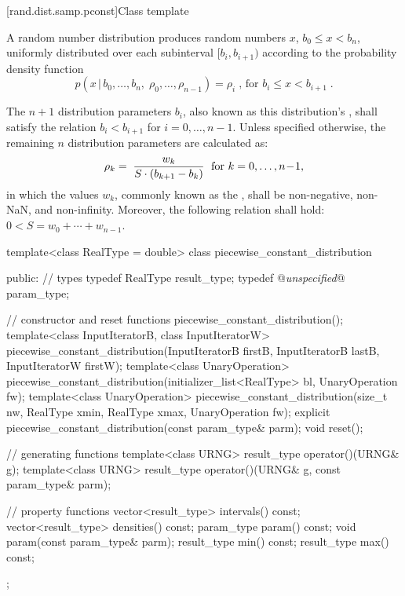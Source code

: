 [rand.dist.samp.pconst]{Class template }%
%

\pnum
A  random number distribution
produces random numbers $x$,
$ b_0 \leq x < b_n $,
uniformly distributed over each subinterval
$ [ b_i, b_{i+1} ) $
according to the probability density function
%
\[%
 p(x\,|\,b_0,\ldots,b_n,\;\rho_0,\ldots,\rho_{n-1})
      = \rho_i
\; \mbox{,}
\mbox{ for } b_i \le x < b_{i+1}
\; \mbox{.}
\]

\pnum
The $n+1$ distribution parameters $b_i$,
also known as this distribution's %
%
%
, shall satisfy the relation
 $ b_i < b_{i+1} $
for $i = 0, \ldots, n\!-\!1 $.
Unless specified otherwise,
the remaining $n$ distribution parameters are calculated as:
\[%
 \rho_k = \;
   {w_k \over {S \cdot (b_{k+1}-b_k)}}
   \; \mbox{ for } k = 0, \ldots, n\!-\!1,
\]
in which the values $w_k$,
commonly known as the %
%
%
, shall be non-negative, non-NaN, and non-infinity.
Moreover, the following relation shall hold:
 $ 0 < S = w_0 + \cdots + w_{n-1} $.

\begin{codeblock}
template<class RealType = double>
 class piecewise_constant_distribution
{
public:
 // types
 typedef RealType result_type;
 typedef @\textit{unspecified}@ param_type;

 // constructor and reset functions
 piecewise_constant_distribution();
 template<class InputIteratorB, class InputIteratorW>
   piecewise_constant_distribution(InputIteratorB firstB, InputIteratorB lastB,
                                   InputIteratorW firstW);
 template<class UnaryOperation>
   piecewise_constant_distribution(initializer_list<RealType> bl, UnaryOperation fw);
 template<class UnaryOperation>
   piecewise_constant_distribution(size_t nw, RealType xmin, RealType xmax, UnaryOperation fw);
 explicit piecewise_constant_distribution(const param_type& parm);
 void reset();

 // generating functions
 template<class URNG>
   result_type operator()(URNG& g);
 template<class URNG>
   result_type operator()(URNG& g, const param_type& parm);

 // property functions
 vector<result_type> intervals() const;
 vector<result_type> densities() const;
 param_type param() const;
 void param(const param_type& parm);
 result_type min() const;
 result_type max() const;
};
\end{codeblock}


